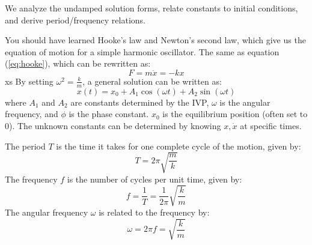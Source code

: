 \documentclass[11pt]{report}
\begin{document}
We analyze the undamped solution forms, relate constants to initial conditions, and derive period/frequency relations.
\begin{definition}
    You should have learned Hooke's law and Newton's second law, which give us the equation of motion for a simple harmonic oscillator. The same as equation (\ref{eq:hooke}), which can be rewritten as:
    \begin{equation}\label{eq:newton_hooke}
        F = m\ddot{x} = -kx
    \end{equation}xs
    By setting $\omega^2 = \frac{k}{m}$, a general solution can be written as:
    \begin{equation}\label{eq:sho_general}
        x(t) = x_0 + A_1 \cos(\omega t) + A_2 \sin(\omega t)
    \end{equation}
    where $A_1$ and $A_2$ are constants determined by the IVP, $\omega$ is the angular frequency, and $\phi$ is the phase constant. $x_0$ is the equilibrium position (often set to 0). The unknown constants can be determined by knowing $x, \dot{x}$ at specific times.
\end{definition}

\begin{definition}
    The period \( T \) is the time it takes for one complete cycle of the motion, given by:
    \begin{equation}\label{eq:period}
        T = 2\pi \sqrt{\frac{m}{k}}
    \end{equation}
    The frequency \( f \) is the number of cycles per unit time, given by:
    \begin{equation}\label{eq:frequency}
        f = \frac{1}{T} = \frac{1}{2\pi} \sqrt{\frac{k}{m}}
    \end{equation}
    The angular frequency \( \omega \) is related to the frequency by:
    \begin{equation}\label{eq:omega_rel}
        \omega = 2\pi f = \sqrt{\frac{k}{m}}
    \end{equation}
    
\end{definition}
\end{document}
